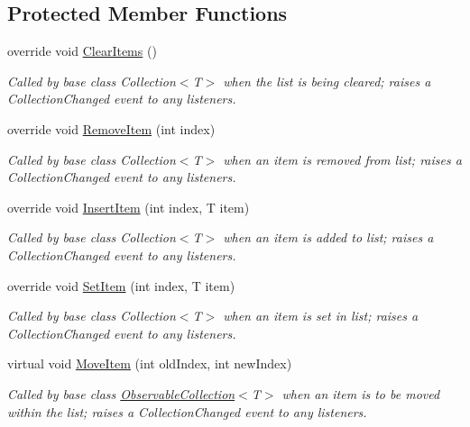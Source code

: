 \subsection*{Protected Member Functions}
\begin{DoxyCompactItemize}
\item 
override void \hyperlink{class_system_1_1_collections_1_1_object_model_1_1_observable_collection_ab3957b9a21cee219a451821557229407}{Clear\+Items} ()
\begin{DoxyCompactList}\small\item\em Called by base class Collection$<$T$>$ when the list is being cleared; raises a Collection\+Changed event to any listeners. \end{DoxyCompactList}\item 
override void \hyperlink{class_system_1_1_collections_1_1_object_model_1_1_observable_collection_a1b5ac98a81dbb8bde1a153228458412c}{Remove\+Item} (int index)
\begin{DoxyCompactList}\small\item\em Called by base class Collection$<$T$>$ when an item is removed from list; raises a Collection\+Changed event to any listeners. \end{DoxyCompactList}\item 
override void \hyperlink{class_system_1_1_collections_1_1_object_model_1_1_observable_collection_a8dd80a97bec92509f72bd6e6f35d889d}{Insert\+Item} (int index, T item)
\begin{DoxyCompactList}\small\item\em Called by base class Collection$<$T$>$ when an item is added to list; raises a Collection\+Changed event to any listeners. \end{DoxyCompactList}\item 
override void \hyperlink{class_system_1_1_collections_1_1_object_model_1_1_observable_collection_a98cfb0d2e352b7d36a228eafaa50cefc}{Set\+Item} (int index, T item)
\begin{DoxyCompactList}\small\item\em Called by base class Collection$<$T$>$ when an item is set in list; raises a Collection\+Changed event to any listeners. \end{DoxyCompactList}\item 
virtual void \hyperlink{class_system_1_1_collections_1_1_object_model_1_1_observable_collection_ae2777f92c49ec735601c43ef5f9e1179}{Move\+Item} (int old\+Index, int new\+Index)
\begin{DoxyCompactList}\small\item\em Called by base class \hyperlink{class_system_1_1_collections_1_1_object_model_1_1_observable_collection}{Observable\+Collection}$<$T$>$ when an item is to be moved within the list; raises a Collection\+Changed event to any listeners. \end{DoxyCompactList}\item 

\end{DoxyCompactItemize}
